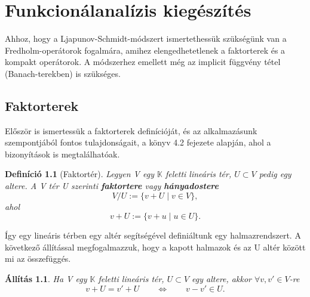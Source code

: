 \documentclass[oneside, titlepage, 12pt, a4paper]{report}
\newtheorem{definition}{Definíció}[section]
\newtheorem{statement}{Állítás}[section]
\begin{document}


\onehalfspacing
\chapter{Funkcionálanalízis kiegészítés}	%
\label{chap:Funcanal_ext}

Ahhoz, hogy a Ljapunov-Schmidt-módszert ismertethessük szükségünk van a Fredholm-operátorok fogalmára, amihez elengedhetetlenek a faktorterek és a kompakt operátorok. A módszerhez emellett még az implicit függvény tétel (Banach-terekben) is szükséges.


%
\section{Faktorterek}
\label{sec:Quotient_space}

Először is ismertessük a faktorterek definícióját, és az alkalmazásunk szempontjából fontos tulajdonságait, a \cite{faktorter} könyv 4.2 fejezete alapján, ahol a bizonyítások is megtalálhatóak.
\begin{definition}[Faktortér]
Legyen V egy $\mathbb{K}$ feletti lineáris tér, $U \subset V$ pedig egy altere. A V tér U szerinti \textbf{faktortere} vagy \textbf{hányadostere}
\begin{equation}
V / U := \{v + U \mid v \in V\},
\end{equation}
ahol
\begin{equation}
v + U := \{v + u \mid u \in U \}.
\end{equation}
\end{definition}

Így egy lineáris térben egy altér segítségével definiáltunk egy halmazrendszert. A következő állítással megfogalmazzuk, hogy a kapott halmazok és az U altér között mi az összefüggés.
\begin{statement}
Ha V egy $\mathbb{K}$ feletti lineáris tér, $U \subset V$ egy altere, akkor $\forall v, v' \in V$-re
\begin{equation}
v + U = v' + U \qquad \Leftrightarrow \qquad v - v' \in U.
\end{equation}
\end{statement}
\end{document}
